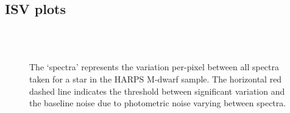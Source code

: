 \subsection{ISV plots}
\begin{figure}[!h]
    \\
    \\
    \caption{The `spectra' represents the variation per-pixel between all spectra taken for a star in the HARPS M-dwarf sample. The horizontal red dashed line indicates the threshold between significant variation and the baseline noise due to photometric noise varying between spectra.}
\end{figure}

